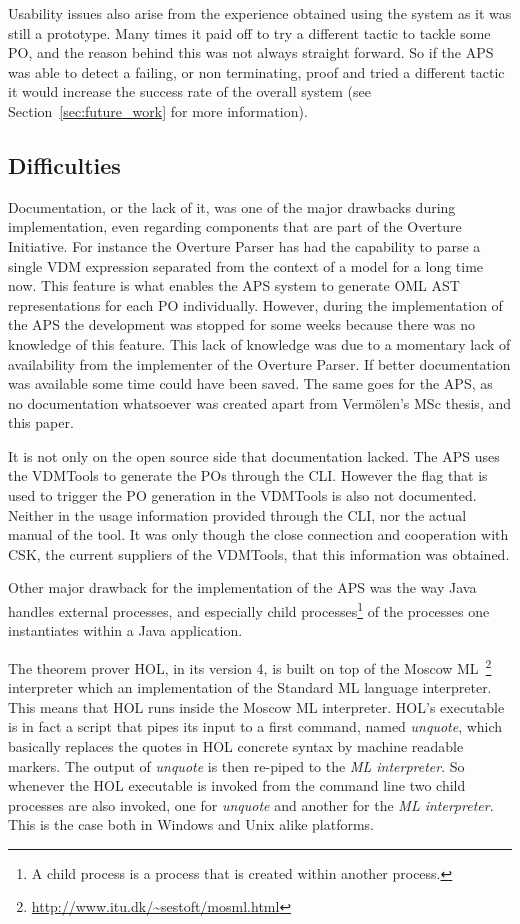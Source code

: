 \documentclass[]{article}
\begin{document}
Usability issues also arise from the experience obtained using the system as it was still a prototype.
Many times it paid off to try a different tactic to tackle some PO, and the reason behind this was not always straight forward.
So if the APS was able to detect a failing, or non terminating, proof and tried a different tactic it would increase the success rate of the overall system (see Section~\ref{sec:future_work} for more information).

\subsection{Difficulties}
\label{sub:implementation_difficulties}

Documentation, or the lack of it, was one of the major drawbacks during implementation, even regarding components that are part of the Overture Initiative.
For instance the Overture Parser has had the capability to parse a single VDM expression separated from the context of a model for a long time now.
This feature is what enables the APS system to generate OML AST representations for each PO individually.
However, during the implementation of the APS the development was stopped for some weeks because there was no knowledge of this feature.
This lack of knowledge was due to a momentary lack of availability from the implementer of the Overture Parser.
If better documentation was available some time could have been saved. 
The same goes for the APS, as no documentation whatsoever was created apart from Verm\"olen's MSc thesis, and this paper.

It is not only on the open source side that documentation lacked. 
The APS uses the VDMTools to generate the POs through the CLI.
However the flag that is used to trigger the PO generation in the VDMTools is also not documented.
Neither in the usage information provided through the CLI, nor the actual manual of the tool.
It was only though the close connection and cooperation with CSK, the current suppliers of the VDMTools, that this information was obtained.

Other major drawback for the implementation of the APS was the way Java handles external processes, and especially child processes\footnote{A child process is a process that is created within another process.} of the processes one instantiates within a Java application.

The theorem prover HOL, in its version 4, is built on top of the Moscow ML~\footnote{\url{http://www.itu.dk/~sestoft/mosml.html}} interpreter which an implementation of the Standard ML language interpreter.
This means that HOL runs inside the Moscow ML interpreter.
HOL's executable is in fact a script that pipes its input to a first command, named \emph{unquote}, which basically replaces the quotes in HOL concrete syntax by machine readable markers.
The output of \emph{unquote} is then re-piped to the \emph{ML interpreter}.
So whenever the HOL executable is invoked from the command line two child processes are also invoked, one for \emph{unquote} and another for the \emph{ML interpreter}.
This is the case both in Windows and Unix alike platforms.
\end{document}

